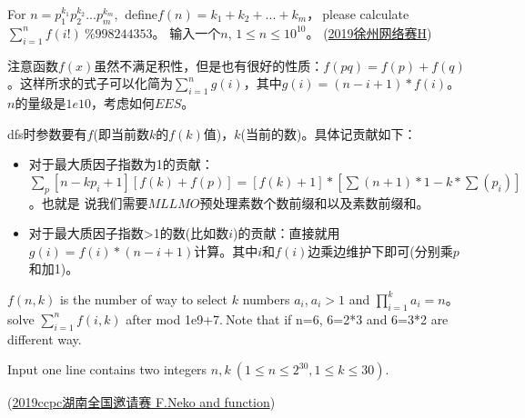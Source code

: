 \vbox{}

\begin{example}
	For $n=p_1^{k_1}p_2^{k_2}...p_m^{k_m}$, $\ $define$f(n)=k_1 + k_2 + ... + k_m$，$\ $please calculate $\sum_{i=1}^n f(i!)\ \%998244353$。
	输入一个$n$, $1\le n \le 10^{10}$。
	(\href{https://nanti.jisuanke.com/t/41390}{2019徐州网络赛H})
\end{example}

\begin{solution}
	注意函数$f(x)$虽然不满足积性，但是也有很好的性质：$f(pq) = f(p) + f(q)$。这样所求的式子可以化简为$\sum_{i=1}^n g(i)$，其中$g(i)=(n-i+1)*f(i)$。
	$n$的量级是$1e10$，考虑如何$EES$。
	
	dfs时参数要有$f$(即当前数$k$的$f(k)$值)，$k$(当前的数)。具体记贡献如下：
	\begin{itemize}
		\item 对于最大质因子指数为1的贡献：$\sum_{p}\left[n-k p_{i}+1\right][f(k)+f(p)]=[f(k)+1] *\left[\sum(n+1) * 1-k * \sum\left(p_{i}\right)\right]$。也就是
		说我们需要$MLLMO$预处理素数个数前缀和以及素数前缀和。
		\item 对于最大质因子指数>1的数(比如数$i$)的贡献：直接就用$g(i)=f(i)*(n-i+1)$计算。其中$i$和$f(i)$边乘边维护下即可(分别乘$p$和加1)。
	\end{itemize}
\end{solution}





\vbox{}



\begin{example}
	$f(n,k)$ is the number of way to select $k$ numbers $a_i$,$\ a_i>1$ and $\prod_{i=1}^{k} a_{i} = n$。
	solve $\sum_{i = 1} ^ {n} f(i,k)$ after mod 1e9+7.$\ $Note that if n=6, 6=2*3 and 6=3*2 are different way.
	
	Input one line contains two integers $n,k\ (1\le n\le 2^{30},1\le k\le 30)$.
	
	(\href{http://acm.hdu.edu.cn/showproblem.php?pid=6537}{2019ccpc湖南全国邀请赛 F.Neko and function})
\end{example}

